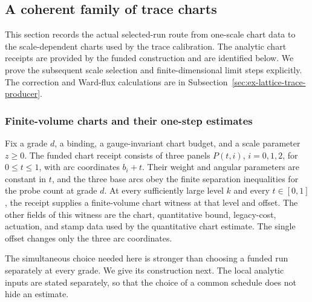 \subsection{A coherent family of trace charts}
\label{sec:ex-lattice-firesky-gallery}

This section records the actual selected-run route from one-scale chart data
to the scale-dependent charts used by the trace calibration. The analytic
chart receipts are provided by the funded construction and are identified
below. We prove the subsequent scale selection and finite-dimensional limit
steps explicitly. The correction and Ward-flux calculations are in
Subsection~\ref{sec:ex-lattice-trace-producer}.

\subsubsection{Finite-volume charts and their one-step estimates}

Fix a grade $d$, a binding, a gauge-invariant chart budget, and a scale
parameter $z\geq0$. The funded chart receipt consists of three panels
$P(t,i)$, $i=0,1,2$, for $0\leq t\leq1$, with arc coordinates $b_i+t$.
Their weight and angular parameters are constant in $t$, and the three
base arcs obey the finite separation inequalities for the probe count at
grade $d$. At every sufficiently large level $k$ and every $t\in[0,1]$,
the receipt supplies a finite-volume chart witness at that level and
offset. The other fields of this witness are the chart, quantitative bound,
legacy-cost, actuation, and stamp data used by the quantitative chart
estimate. The single offset changes only the three arc coordinates.

The simultaneous choice needed here is stronger than choosing a funded
run separately at every grade. We give its construction next. The local
analytic inputs are stated separately, so that the choice of a common
schedule does not hide an estimate.


